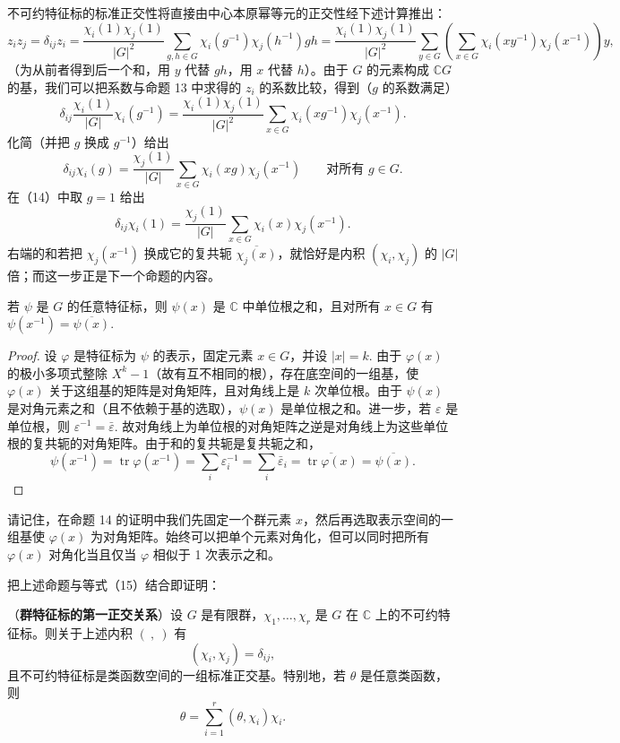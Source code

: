 不可约特征标的标准正交性将直接由中心本原幂等元的正交性经下述计算推出：
\[
z_iz_j = \delta_{ij}z_i = \frac{\chi_i(1)\chi_j(1)}{|G|^2}\sum_{g,h \in G}\chi_i(g^{-1})\chi_j(h^{-1})gh
= \frac{\chi_i(1)\chi_j(1)}{|G|^2}\sum_{y \in G}\left(\sum_{x \in G}\chi_i(xy^{-1})\chi_j(x^{-1})\right)y,
\]
（为从前者得到后一个和，用 \(y\) 代替 \(gh\)，用 \(x\) 代替 \(h\)）。由于 \(G\) 的元素构成 \(\mathbb{C}G\) 的基，我们可以把系数与命题 13 中求得的 \(z_i\) 的系数比较，得到（\(g\) 的系数满足）
\[
\delta_{ij}\frac{\chi_i(1)}{|G|}\chi_i(g^{-1}) = \frac{\chi_i(1)\chi_j(1)}{|G|^2}\sum_{x \in G}\chi_i(xg^{-1})\chi_j(x^{-1}).
\]
化简（并把 \(g\) 换成 \(g^{-1}\)）给出
\[
\delta_{ij}\chi_i(g) = \frac{\chi_j(1)}{|G|}\sum_{x \in G}\chi_i(xg)\chi_j(x^{-1}) \qquad \text{对所有 } g \in G. \tag{18.14}
\]
在（14）中取 \(g = 1\) 给出
\[
\delta_{ij}\chi_i(1) = \frac{\chi_j(1)}{|G|}\sum_{x \in G}\chi_i(x)\chi_j(x^{-1}). \tag{18.15}
\]
右端的和若把 \(\chi_j(x^{-1})\) 换成它的复共轭 \(\overline{\chi_j(x)}\)，就恰好是内积 \((\chi_i, \chi_j)\) 的 \(|G|\) 倍；而这一步正是下一个命题的内容。

\begin{proposition}\label{pro:18.14}
若 \(\psi\) 是 \(G\) 的任意特征标，则 \(\psi(x)\) 是 \(\mathbb{C}\) 中单位根之和，且对所有 \(x \in G\) 有 \(\psi(x^{-1}) = \overline{\psi(x)}\).
\end{proposition}

\begin{proof}
设 \(\varphi\) 是特征标为 \(\psi\) 的表示，固定元素 \(x \in G\)，并设 \(|x| = k\). 由于 \(\varphi(x)\) 的极小多项式整除 \(X^k-1\)（故有互不相同的根），存在底空间的一组基，使 \(\varphi(x)\) 关于这组基的矩阵是对角矩阵，且对角线上是 \(k\) 次单位根。由于 \(\psi(x)\) 是对角元素之和（且不依赖于基的选取），\(\psi(x)\) 是单位根之和。进一步，若 \(\varepsilon\) 是单位根，则 \(\varepsilon^{-1} = \bar\varepsilon\). 故对角线上为单位根的对角矩阵之逆是对角线上为这些单位根的复共轭的对角矩阵。由于和的复共轭是复共轭之和，
\[
\psi(x^{-1}) = \operatorname{tr}\varphi(x^{-1}) = \sum_i\varepsilon_i^{-1} = \sum_i\bar\varepsilon_i = \overline{\operatorname{tr}\varphi(x)} = \overline{\psi(x)}.
\]
\end{proof}

请记住，在命题 14 的证明中我们先固定一个群元素 \(x\)，然后再选取表示空间的一组基使 \(\varphi(x)\) 为对角矩阵。始终可以把单个元素对角化，但可以同时把所有 \(\varphi(x)\) 对角化当且仅当 \(\varphi\) 相似于 1 次表示之和。

把上述命题与等式（15）结合即证明：

\begin{theorem}\label{thm:18.15}
（\textbf{群特征标的第一正交关系}）设 \(G\) 是有限群，\(\chi_1, \ldots, \chi_r\) 是 \(G\) 在 \(\mathbb{C}\) 上的不可约特征标。则关于上述内积 \((\ ,\ )\) 有
\[
(\chi_i, \chi_j) = \delta_{ij},
\]
且不可约特征标是类函数空间的一组标准正交基。特别地，若 \(\theta\) 是任意类函数，则
\[
\theta = \sum_{i=1}^{r}(\theta, \chi_i)\chi_i.
\]
\end{theorem}


